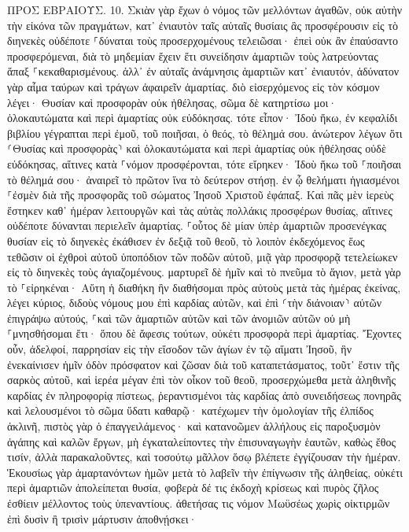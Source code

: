 \documentclass[twoside, 9pt]{extreport}
\begin{document}
ΠΡΟΣ ΕΒΡΑΙΟΥΣ.
10.
Σκιὰν γὰρ ἔχων ὁ νόμος τῶν μελλόντων ἀγαθῶν, οὐκ αὐτὴν τὴν εἰκόνα τῶν πραγμάτων, κατ᾽ ἐνιαυτὸν ταῖς αὐταῖς θυσίαις ἃς προσφέρουσιν εἰς τὸ διηνεκὲς οὐδέποτε ⸀δύναται τοὺς προσερχομένους τελειῶσαι· 
ἐπεὶ οὐκ ἂν ἐπαύσαντο προσφερόμεναι, διὰ τὸ μηδεμίαν ἔχειν ἔτι συνείδησιν ἁμαρτιῶν τοὺς λατρεύοντας ἅπαξ ⸀κεκαθαρισμένους. 
ἀλλ᾽ ἐν αὐταῖς ἀνάμνησις ἁμαρτιῶν κατ᾽ ἐνιαυτόν, 
ἀδύνατον γὰρ αἷμα ταύρων καὶ τράγων ἀφαιρεῖν ἁμαρτίας. 
διὸ εἰσερχόμενος εἰς τὸν κόσμον λέγει· Θυσίαν καὶ προσφορὰν οὐκ ἠθέλησας, σῶμα δὲ κατηρτίσω μοι· 
ὁλοκαυτώματα καὶ περὶ ἁμαρτίας οὐκ εὐδόκησας. 
τότε εἶπον· Ἰδοὺ ἥκω, ἐν κεφαλίδι βιβλίου γέγραπται περὶ ἐμοῦ, τοῦ ποιῆσαι, ὁ θεός, τὸ θέλημά σου. 
ἀνώτερον λέγων ὅτι ⸂Θυσίας καὶ προσφορὰς⸃ καὶ ὁλοκαυτώματα καὶ περὶ ἁμαρτίας οὐκ ἠθέλησας οὐδὲ εὐδόκησας, αἵτινες κατὰ ⸀νόμον προσφέρονται, 
τότε εἴρηκεν· Ἰδοὺ ἥκω τοῦ ⸀ποιῆσαι τὸ θέλημά σου· ἀναιρεῖ τὸ πρῶτον ἵνα τὸ δεύτερον στήσῃ. 
ἐν ᾧ θελήματι ἡγιασμένοι ⸀ἐσμὲν διὰ τῆς προσφορᾶς τοῦ σώματος Ἰησοῦ Χριστοῦ ἐφάπαξ. 
Καὶ πᾶς μὲν ἱερεὺς ἕστηκεν καθ᾽ ἡμέραν λειτουργῶν καὶ τὰς αὐτὰς πολλάκις προσφέρων θυσίας, αἵτινες οὐδέποτε δύνανται περιελεῖν ἁμαρτίας. 
⸀οὗτος δὲ μίαν ὑπὲρ ἁμαρτιῶν προσενέγκας θυσίαν εἰς τὸ διηνεκὲς ἐκάθισεν ἐν δεξιᾷ τοῦ θεοῦ, 
τὸ λοιπὸν ἐκδεχόμενος ἕως τεθῶσιν οἱ ἐχθροὶ αὐτοῦ ὑποπόδιον τῶν ποδῶν αὐτοῦ, 
μιᾷ γὰρ προσφορᾷ τετελείωκεν εἰς τὸ διηνεκὲς τοὺς ἁγιαζομένους. 
μαρτυρεῖ δὲ ἡμῖν καὶ τὸ πνεῦμα τὸ ἅγιον, μετὰ γὰρ τὸ ⸀εἰρηκέναι· 
Αὕτη ἡ διαθήκη ἣν διαθήσομαι πρὸς αὐτοὺς μετὰ τὰς ἡμέρας ἐκείνας, λέγει κύριος, διδοὺς νόμους μου ἐπὶ καρδίας αὐτῶν, καὶ ἐπὶ ⸂τὴν διάνοιαν⸃ αὐτῶν ἐπιγράψω αὐτούς, 
⸀καὶ τῶν ἁμαρτιῶν αὐτῶν καὶ τῶν ἀνομιῶν αὐτῶν οὐ μὴ ⸀μνησθήσομαι ἔτι· 
ὅπου δὲ ἄφεσις τούτων, οὐκέτι προσφορὰ περὶ ἁμαρτίας. 
Ἔχοντες οὖν, ἀδελφοί, παρρησίαν εἰς τὴν εἴσοδον τῶν ἁγίων ἐν τῷ αἵματι Ἰησοῦ, 
ἣν ἐνεκαίνισεν ἡμῖν ὁδὸν πρόσφατον καὶ ζῶσαν διὰ τοῦ καταπετάσματος, τοῦτ᾽ ἔστιν τῆς σαρκὸς αὐτοῦ, 
καὶ ἱερέα μέγαν ἐπὶ τὸν οἶκον τοῦ θεοῦ, 
προσερχώμεθα μετὰ ἀληθινῆς καρδίας ἐν πληροφορίᾳ πίστεως, ῥεραντισμένοι τὰς καρδίας ἀπὸ συνειδήσεως πονηρᾶς καὶ λελουσμένοι τὸ σῶμα ὕδατι καθαρῷ· 
κατέχωμεν τὴν ὁμολογίαν τῆς ἐλπίδος ἀκλινῆ, πιστὸς γὰρ ὁ ἐπαγγειλάμενος· 
καὶ κατανοῶμεν ἀλλήλους εἰς παροξυσμὸν ἀγάπης καὶ καλῶν ἔργων, 
μὴ ἐγκαταλείποντες τὴν ἐπισυναγωγὴν ἑαυτῶν, καθὼς ἔθος τισίν, ἀλλὰ παρακαλοῦντες, καὶ τοσούτῳ μᾶλλον ὅσῳ βλέπετε ἐγγίζουσαν τὴν ἡμέραν. 
Ἑκουσίως γὰρ ἁμαρτανόντων ἡμῶν μετὰ τὸ λαβεῖν τὴν ἐπίγνωσιν τῆς ἀληθείας, οὐκέτι περὶ ἁμαρτιῶν ἀπολείπεται θυσία, 
φοβερὰ δέ τις ἐκδοχὴ κρίσεως καὶ πυρὸς ζῆλος ἐσθίειν μέλλοντος τοὺς ὑπεναντίους. 
ἀθετήσας τις νόμον Μωϋσέως χωρὶς οἰκτιρμῶν ἐπὶ δυσὶν ἢ τρισὶν μάρτυσιν ἀποθνῄσκει· 
\end{document}
